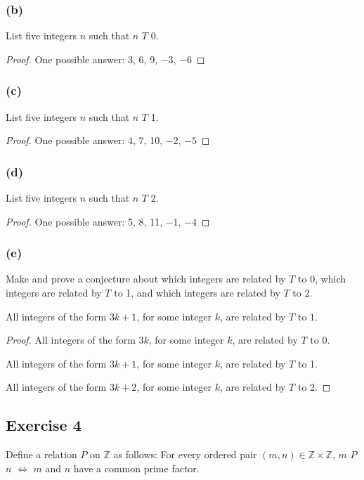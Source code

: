 \documentclass[14pt]{extarticle}
\newcommand{\Z}{\mathbb{Z}}
\begin{document}
\subsubsection{(b)}
List five integers $n$ such that $n$ $T$ $0$.

\begin{proof}
One possible answer: 3, 6, 9, $-3$, $-6$
\end{proof}

\subsubsection{(c)}
List five integers $n$ such that $n$ $T$ 1.

\begin{proof}
One possible answer: 4, 7, 10, $-2$, $-5$
\end{proof}

\subsubsection{(d)}
List five integers $n$ such that $n$ $T$ $2$.

\begin{proof}
One possible answer: 5, 8, 11, $-1$, $-4$
\end{proof}

\subsubsection{(e)}
Make and prove a conjecture about which integers are related by $T$ to $0$, which integers are related by $T$ to 
1, and which integers are related by $T$ to 2.

All integers of the form \(3k + 1\), for some integer $k$, are related by $T$ to $1$.

\begin{proof}
All integers of the form \(3k\), for some integer $k$, are related by $T$ to 0.

All integers of the form \(3k+1\), for some integer $k$, are related by $T$ to 1.

All integers of the form \(3k+2\), for some integer $k$, are related by $T$ to 2.
\end{proof}

\subsection{Exercise 4}
Define a relation $P$ on $\Z$ as follows: For every ordered pair \((m, n) \in \Z \times \Z\), $m$ $P$ $n$ \(\iff\) $m$ 
and $n$ have a common prime factor.
\end{document}
